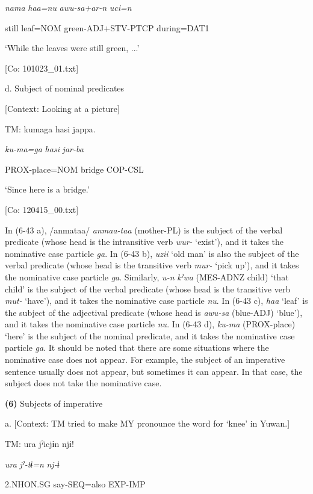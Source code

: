      \textit{nama}  \textit{haa=nu}  \textit{awu-sa+ar-n}  \textit{uci=n}

      still  leaf=NOM  green-ADJ+STV-PTCP  during=DAT1

      ‘While the leaves were still green, ...’

      [Co: 101023\_01.txt]

  d.  Subject of nominal predicates

    [Context: Looking at a picture]

    TM:  kumaga  hasi  jappa.

      \textit{ku-ma=ga}  \textit{hasi}  \textit{jar-ba}

      PROX-place=NOM  bridge  COP-CSL

      ‘Since here is a bridge.’

      [Co: 120415\_00.txt]

In (6-43 a), /anmataa/ \textit{anmaa-taa} (mother-PL) is the subject of the verbal predicate (whose head is the intransitive verb \textit{wur-} ‘exist’), and it takes the nominative case particle \textit{ga}. In (6-43 b), \textit{uzii} ‘old man’ is also the subject of the verbal predicate (whose head is the transitive verb \textit{mur-} ‘pick up’), and it takes the nominative case particle \textit{ga}. Similarly, \textit{u-n} \textit{kˀwa} (MES-ADNZ child) ‘that child’ is the subject of the verbal predicate (whose head is the transitive verb \textit{mut-} ‘have’), and it takes the nominative case particle \textit{nu}. In (6-43 c), \textit{haa} ‘leaf’ is the subject of the adjectival predicate (whose head is \textit{awu-sa} (blue-ADJ) ‘blue’), and it takes the nominative case particle \textit{nu}. In (6-43 d), \textit{ku-ma} (PROX-place) ‘here’ is the subject of the nominal predicate, and it takes the nominative case particle \textit{ga}. It should be noted that there are some situations where the nominative case does not appear. For example, the subject of an imperative sentence usually does not appear, but sometimes it can appear. In that case, the subject does not take the nominative case.

\textbf{(6)}  Subjects of imperative

  a.  [Context: TM tried to make MY pronounce the word for ‘knee’ in Yuwan.]

    TM:  ura  jˀicjɨn  njɨ!

      \textit{ura}  \textit{jˀ-tɨ=n}  \textit{nj-ɨ}

      2.NHON.SG  say-SEQ=also  EXP-IMP

